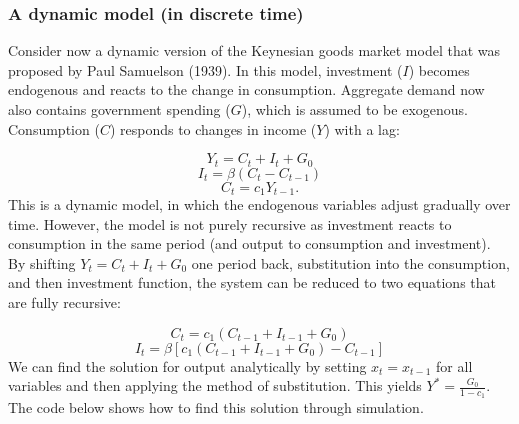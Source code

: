 \documentclass[
  letterpaper,
  DIV=11,
  numbers=noendperiod]{scrreprt}
\begin{document}
\subsubsection{A dynamic model (in discrete
time)}\label{a-dynamic-model-in-discrete-time}

Consider now a dynamic version of the Keynesian goods market model that
was proposed by Paul Samuelson (1939). In this model, investment (\(I\))
becomes endogenous and reacts to the change in consumption. Aggregate
demand now also contains government spending (\(G\)), which is assumed
to be exogenous. Consumption (\(C\)) responds to changes in income
(\(Y\)) with a lag:

\[
Y_t = C_t + I_t + G_0
\] \[
I_t = \beta(C_t - C_{t-1})
\] \[
C_t=c_1Y_{t-1}.
\] This is a dynamic model, in which the endogenous variables adjust
gradually over time. However, the model is not purely recursive as
investment reacts to consumption in the same period (and output to
consumption and investment). By shifting \(Y_t=C_t + I_t + G_0\) one
period back, substitution into the consumption, and then investment
function, the system can be reduced to two equations that are fully
recursive:

\[
C_t= c_1(C_{t-1} + I_{t-1} + G_0)
\] \[
I_t= \beta[c_1(C_{t-1} + I_{t-1} + G_0) - C_{t-1}]
\] We can find the solution for output analytically by setting
\(x_t=x_{t-1}\) for all variables and then applying the method of
substitution. This yields \(Y^*=\frac{G_0}{1-c_1}\). The code below
shows how to find this solution through simulation.
\end{document}
